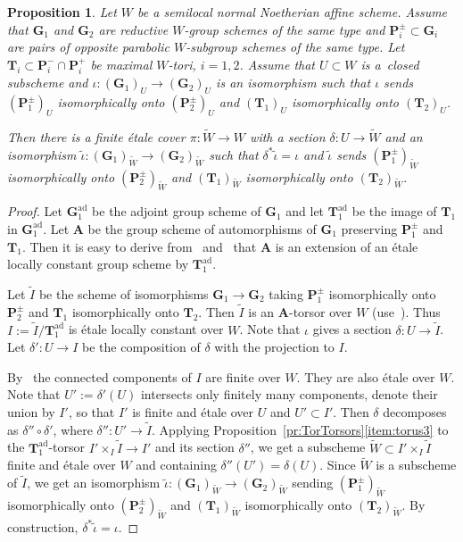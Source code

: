 \documentclass[11pt]{amsart}
\DeclareMathOperator{\ad}{ad}
\theoremstyle{plain}
\newtheorem{proposition}{Proposition}[section]
\theoremstyle{definition}
\theoremstyle{remark}
\newcommand\bA{{\mathbf A}}
\newcommand\bT{{\mathbf T}}
\newcommand\bG{{\mathbf G}}
\newcommand\bP{{\mathbf P}}
\begin{document}
\begin{proposition}\label{pr:EquatingGroups}
Let $W$ be a semilocal normal Noetherian affine scheme. Assume that $\bG_1$ and $\bG_2$ are reductive $W$-group schemes of the same type and $\bP_i^\pm\subset\bG_i$ are pairs of opposite parabolic $W$-subgroup schemes of the same type. Let $\bT_i\subset\bP^-_i\cap\bP^+_i$ be maximal $W$-tori, $i=1,2$. Assume that $U\subset W$ is a~closed subscheme and $\iota\colon(\bG_1)_U\to(\bG_2)_U$ is an isomorphism such that $\iota$ sends $(\bP_1^\pm)_U$ isomorphically onto $(\bP_2^\pm)_U$ and $(\bT_1)_U$ isomorphically onto $(\bT_2)_U$.

Then there is a finite \'etale cover $\pi\colon\widetilde W\to W$ with a section $\delta\colon U\to\widetilde W$ and an isomorphism $\tilde\iota\colon(\bG_1)_{\widetilde W}\to(\bG_2)_{\widetilde W}$ such that $\delta^*\tilde\iota=\iota$ and $\tilde\iota$ sends $(\bP_1^\pm)_{\widetilde W}$ isomorphically onto $(\bP_2^\pm)_{\widetilde W}$ and $(\bT_1)_{\widetilde W}$ isomorphically onto $(\bT_2)_{\widetilde W}$.
\end{proposition}
\begin{proof}
Let $\bG_1^{\ad}$ be the adjoint group scheme of $\bG_1$ and let $\bT_1^{\ad}$ be the image of $\bT_1$ in $\bG_1^{\ad}$.
Let $\bA$ be the group scheme of automorphisms of $\bG_1$ preserving $\bP^\pm_1$ and $\bT_1$. Then it is easy to derive from~\cite[exp.~XXIV, prop.~2.1]{SGA3-3} and~\cite[exp.~XXIV, thm.~1.3(ii)]{SGA3-3} that $\bA$ is an extension of an \'etale locally constant group scheme by $\bT^{\ad}_1$.

Let $\widetilde I$ be the scheme of isomorphisms $\bG_1\to\bG_2$ taking $\bP^\pm_1$ isomorphically onto $\bP^\pm_2$ and $\bT_1$ isomorphically onto $\bT_2$. Then $\widetilde I$ is an $\bA$-torsor over $W$ (use~\cite[exp.~XXVI, prop.~1.3]{SGA3-3}). Thus $I:=\widetilde I/\bT_1^{\ad}$ is \'etale locally constant over $W$. Note that $\iota$ gives a section $\delta\colon U\to\widetilde I$. Let $\delta'\colon U\to I$ be the composition of $\delta$ with the projection to $I$.

By~\cite[exp.~X, cor.~5.14]{SGA3-2} the connected components of $I$ are finite over $W$. They are also \'etale over $W$. Note that $U':=\delta'(U)$ intersects only finitely many components, denote their union by $I'$, so that $I'$ is finite and \'etale over $U$ and $U'\subset I'$. Then $\delta$ decomposes as $\delta''\circ\delta'$, where $\delta''\colon U'\to\widetilde I$. Applying Proposition~\ref{pr:TorTorsors}\eqref{item:torus3} to the $\bT_1^{\ad}$-torsor $I'\times_I\widetilde I\to I'$ and its section $\delta''$, we get a subscheme $\widetilde W\subset I'\times_I\widetilde I$ finite and \'etale over $W$ and containing $\delta''(U')=\delta(U)$. Since $\widetilde W$ is a subscheme of $\widetilde I$, we get an isomorphism $\tilde\iota\colon(\bG_1)_{\widetilde W}\to(\bG_2)_{\widetilde W}$ sending $(\bP_1^\pm)_{\widetilde W}$ isomorphically onto $(\bP_2^\pm)_{\widetilde W}$ and $(\bT_1)_{\widetilde W}$ isomorphically onto $(\bT_2)_{\widetilde W}$. By construction, $\delta^*\tilde\iota=\iota$.
\end{proof}
\end{document}

